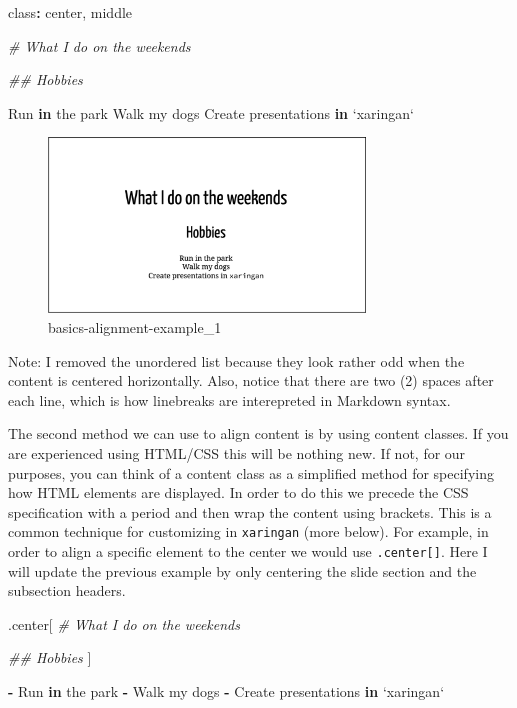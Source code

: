 \documentclass[
]{book}
\newenvironment{Shaded}{\begin{snugshade}}{\end{snugshade}}
\newcommand{\CommentTok}[1]{\textcolor[rgb]{0.37,0.37,0.37}{\textit{#1}}}
\newcommand{\ControlFlowTok}[1]{\textcolor[rgb]{0.27,0.27,0.27}{\textbf{#1}}}
\newcommand{\DataTypeTok}[1]{\textcolor[rgb]{0.27,0.27,0.27}{#1}}
\newcommand{\NormalTok}[1]{#1}
\newcommand{\OperatorTok}[1]{\textcolor[rgb]{0.43,0.43,0.43}{\textbf{#1}}}
\newcommand{\StringTok}[1]{\textcolor[rgb]{0.5,0.5,0.5}{#1}}
\begin{document}
\begin{Shaded}
\begin{Highlighting}[]
\NormalTok{class}\OperatorTok{:}\StringTok{ }\NormalTok{center, middle}

\CommentTok{# What I do on the weekends}

\CommentTok{## Hobbies}

\NormalTok{Run }\ControlFlowTok{in}\NormalTok{ the park  }
\NormalTok{Walk my dogs  }
\NormalTok{Create presentations }\ControlFlowTok{in} \StringTok{`}\DataTypeTok{xaringan}\StringTok{`}
\end{Highlighting}
\end{Shaded}

\begin{figure}
\centering
\includegraphics[width=0.75\textwidth,height=\textheight]{img/02_basics-alignment-example_1.png}
\caption{basics-alignment-example\_1}
\end{figure}

Note: I removed the unordered list because they look rather odd when the content is centered horizontally. Also, notice that there are two (2) spaces after each line, which is how linebreaks are interepreted in Markdown syntax.

The second method we can use to align content is by using content classes. If you are experienced using HTML/CSS this will be nothing new. If not, for our purposes, you can think of a content class as a simplified method for specifying how HTML elements are displayed. In order to do this we precede the CSS specification with a period and then wrap the content using brackets. This is a common technique for customizing in \texttt{xaringan} (more below). For example, in order to align a specific element to the center we would use \texttt{.center{[}{]}}. Here I will update the previous example by only centering the slide section and the subsection headers.

\begin{Shaded}
\begin{Highlighting}[]
\NormalTok{.center[}
\CommentTok{# What I do on the weekends}

\CommentTok{## Hobbies}
\NormalTok{]}

\OperatorTok{-}\StringTok{ }\NormalTok{Run }\ControlFlowTok{in}\NormalTok{ the park }
\OperatorTok{-}\StringTok{ }\NormalTok{Walk my dogs }
\OperatorTok{-}\StringTok{ }\NormalTok{Create presentations }\ControlFlowTok{in} \StringTok{`}\DataTypeTok{xaringan}\StringTok{`}
\end{Highlighting}
\end{Shaded}
\end{document}
